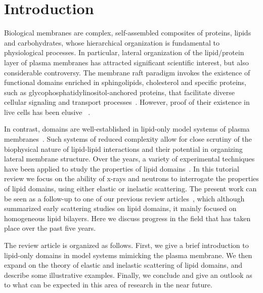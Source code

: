 \documentclass[8.5pt,twoside,twocolumn]{article}
\begin{document}



\section{Introduction}

Biological membranes are complex, self-assembled composites of proteins, lipids and carbohydrates, whose hierarchical organization is fundamental to physiological processes. In particular, lateral organization of the lipid/protein layer of plasma membranes has attracted significant scientific interest, but also considerable controversy. The membrane raft paradigm invokes the existence of functional domains enriched in sphingolipids, cholesterol and specific proteins, such as glycophosphatidylinositol-anchored proteins, that facilitate diverse cellular signaling and transport processes~\cite{Lingwood.2010}. However, proof of  their existence in live cells has been elusive ~\cite{Kusumi.2012,Kraft.2013,Sevcsik.2015,Pan.2012}.

In contrast, domains are well-established in lipid-only model systems of plasma membranes~\cite{Feigenson.2009,Marsh.2009}. Such systems of reduced complexity allow for close scrutiny of the biophysical nature of lipid-lipid interactions and their potential in organizing lateral membrane structure. Over the years, a variety of experimental techniques have been applied to study the properties of lipid domains~\cite{Heberle.2014}. In this tutorial review we focus on the ability of x-rays and neutrons to interrogate the properties of lipid domains, using either elastic or inelastic scattering. The present work can be seen as a follow-up to one of our previous review articles~\cite{Pabst.2010}, which although summarized early scattering studies on lipid domains, it mainly focused on homogeneous lipid bilayers. Here we discuss progress in the field that has taken place over the past five years.

The review article is organized as follows. First, we give a brief introduction to lipid-only domains in model systems mimicking the plasma membrane. We then expand on the theory of elastic and inelastic scattering of lipid domains, and describe some illustrative examples. Finally, we conclude and give an outlook as to what can be expected in this area of research in the near future.
\end{document}

